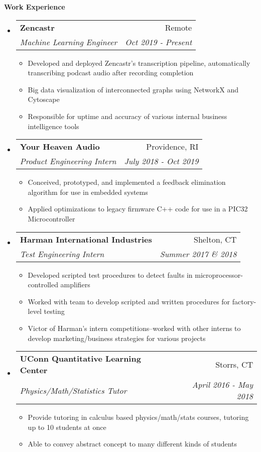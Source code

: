 \documentclass[letterpaper,11pt]{article}
\makeatletter
\newcommand{\resitem}[1]{\item #1 \vspace{-2pt}}
\newcommand{\resheading}[1]{{\large \colorbox{mygrey}{\begin{minipage}{\textwidth}{\textbf{#1 \vphantom{p\^{E}}}}\end{minipage}}}}
\newcommand{\ressubheading}[4]{
\begin{tabular*}{6.5in}{l@{\extracolsep{\fill}}r}
		\textbf{#1} & #2 \\
		\textit{#3} & \textit{#4} \\
\end{tabular*}\vspace{-6pt}}
\makeatother
\begin{document}
\resheading{Work Experience}
\begin{itemize}
\item
	\ressubheading{Zencastr}{Remote}{Machine Learning Engineer}{Oct 2019 - Present}
	\begin{itemize}
		\resitem{Developed and deployed Zencastr's transcription pipeline, automatically transcribing podcast audio after recording completion}
        \resitem{Big data visualization of interconnected graphs using NetworkX and Cytoscape}
        \resitem{Responsible for uptime and accuracy of various internal business intelligence tools}
	\end{itemize}

\item 
	\ressubheading{Your Heaven Audio}{Providence, RI}{Product Engineering Intern}{July 2018 - Oct 2019}
	\begin{itemize}
        \resitem{Conceived, prototyped, and implemented a feedback elimination algorithm for use in embedded systems}
        \resitem{Applied optimizations to legacy firmware C++ code for use in a PIC32 Microcontroller}
	\end{itemize}

\item
    \ressubheading{Harman International Industries}{Shelton, CT}{Test Engineering Intern}{Summer 2017 \& 2018}
    \begin{itemize}
        \resitem{Developed scripted test procedures to detect faults in microprocessor-controlled amplifiers}
        \resitem{Worked with team to develop scripted and written procedures for factory-level testing}
        \resitem{Victor of Harman's intern competitions--worked with other interns to develop
        marketing/business strategies for various projects}
    \end{itemize}

\item
	\ressubheading{UConn Quantitative Learning Center}{Storrs, CT}{Physics/Math/Statistics Tutor}{April 2016 - May 2018}
	\begin{itemize}
		\resitem{Provide tutoring in calculus based physics/math/stats courses, tutoring up to 10 students at once}
		\resitem{Able to convey abstract concept to many different kinds of students}
	\end{itemize}
\end{itemize}
\end{document}
